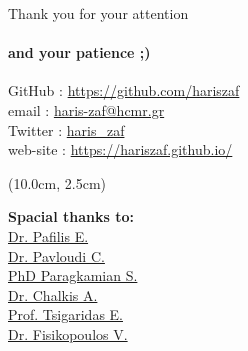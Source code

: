 \documentclass{beamer}
\begin{document}
   \begin{darkframes}
   \begin{frame}{Thank you for your attention}

      \framesubtitle{and your patience ;)}
      GitHub   : \href{https://github.com/hariszaf}{https://github.com/hariszaf} \\
      email    : \href{haris-zaf@hcmr.gr}{haris-zaf@hcmr.gr} \\
      Twitter  : \href{https://twitter.com/haris_zaf}{haris\_zaf} \\
      web-site : \url{https://hariszaf.github.io/} \\
      

      \begin{textblock*}{4.0cm}(10.0cm, 2.5cm)

         \scriptsize \textbf{Spacial thanks to:} \\

         \scriptsize \href{http://lab42open.hcmr.gr/people/evangelospafilis/}{Dr. Pafilis E.} \\
         \scriptsize \href{https://cpavloud.github.io/mysite/projects/}{Dr. Pavloudi C.} \\ 
         \scriptsize \href{https://imbbc.hcmr.gr/user/s-paragkamian/}{PhD Paragkamian S.} \\
         \scriptsize \href{https://tolischal.github.io/}{Dr. Chalkis A.} \\
         \scriptsize \href{https://who.paris.inria.fr/Elias.Tsigaridas/}{Prof. Tsigaridas E.} \\
         \scriptsize \href{https://vissarion.github.io/}{Dr. Fisikopoulos V.} 
         
      \end{textblock*}




\end{frame}
\end{darkframes}
\end{document}
